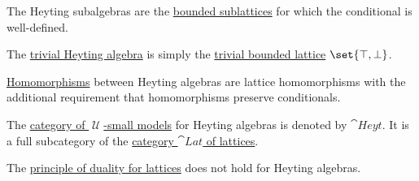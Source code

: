 \begin{definition}
\begin{thmenum}[resume=def:heyting_algebra]
     The Heyting subalgebras are the \hyperref[def:semilattice/submodel]{bounded sublattices} for which the conditional is well-defined.

     The \hyperref[thm:substructures_form_complete_lattice/bottom]{trivial Heyting algebra} is simply the \hyperref[def:semilattice/trivial]{trivial bounded lattice} \( \set{ \top, \bot } \).

     \hyperref[def:first_order_homomorphism]{Homomorphisms} between Heyting algebras are lattice homomorphisms with the additional requirement that homomorphisms preserve conditionals.

     The \hyperref[def:category_of_small_first_order_models]{category of \( \mscrU \)-small models} for Heyting algebras is denoted by \( \cat{Heyt} \). It is a full subcategory of the \hyperref[def:semilattice/category]{category \( \cat{Lat} \) of lattices}.

     The \hyperref[def:semilattice/lattice_duality]{principle of duality for lattices} does not hold for Heyting algebras.
  \end{thmenum}
\end{definition}

